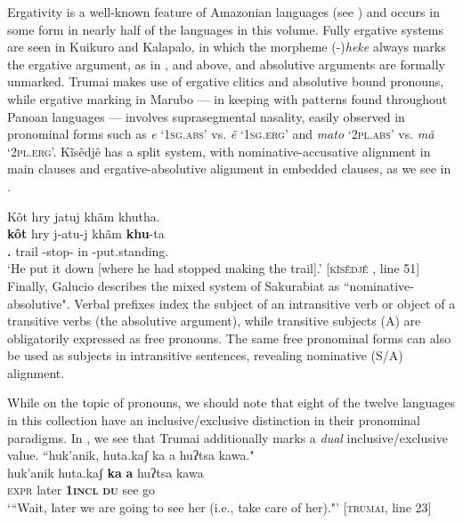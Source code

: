 \documentclass[output=paper,
modfonts,nonflat
]{langsci/langscibook}
\begin{document}
Ergativity is a well-known feature of Amazonian languages (see \citealt{Gildea2010}) and occurs in some form in nearly half of the languages in this volume. Fully ergative systems are seen in Kuikuro and Kalapalo, in which the morpheme (-)\textit{heke} always marks the ergative argument, as in ,  and  above, and absolutive arguments are formally unmarked. Trumai makes use of ergative clitics and absolutive bound pronouns, while ergative marking in Marubo — in keeping with patterns found throughout Panoan languages — involves suprasegmental nasality, easily observed in pronominal forms such as \textit{e} ‘1\textsc{sg.abs}’ vs. \textit{ẽ} ‘1\textsc{sg.erg}’ and \textit{mato} ‘2\textsc{pl.abs}’ vs. \textit{mã} ‘2\textsc{pl.erg}’. Kĩsêdjê has a split system, with nominative-accusative alignment in main clauses and ergative-ab\-so\-lu\-tive alignment in embedded clauses, as we see in . 

\ea\label{ex:intro:33}  Kôt hry jatuj khãm khutha. \\[.3em]
\gll {\ob}  \textbf{kôt }          hry   j-atu-j         {\cb}  khãm \textbf{khu}-ta                    \\
     {} \textbf{\Third.\Erg}{} trail \E-stop-\Nmlz{} {} in   \textbf{\Third}-put.standing.\Sg{} \\
\glt `He put it down [where he had stopped making the trail].' [\textsc{kĩsêdjê }, line 51]\\
\z 
Finally, Galucio describes the mixed system of Sakurabiat as “nominative-ab\-so\-lu\-tive". Verbal prefixes index the subject of an intransitive verb or object of a transitive verbs (the absolutive argument), while transitive subjects (A) are obligatorily expressed as free pronouns. The same free pronominal forms can also be used as subjects in intransitive sentences, revealing nominative (S/A) alignment. 

    While on the topic of pronouns, we should note that eight of the twelve languages in this collection have an inclusive/exclusive distinction in their pronominal paradigms. In , we see that Trumai additionally marks a \textit{dual} inclusive/exclusive value. 
\ea\label{ex:intro:34} “huk'anik, huta.kaʃ ka a huʔtsa kawa."\\[.3em]
\gll huk'anik    huta.kaʃ   \textbf{ka}  \textbf{a}       huʔtsa  kawa\\
\textsc{expr}  later \textbf{\textsc{1incl}} \textbf{\textsc{du}} see go\\
\glt ‘“Wait, later we are going to see her (i.e., take care of her)."' [\textsc{trumai}, line 23]
\z
\end{document}
